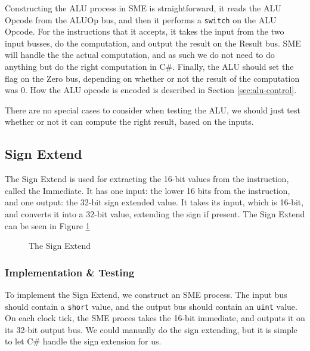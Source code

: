 Constructing the ALU process in SME is straightforward, it reads the ALU Opcode
from the ALUOp bus, and then it performs a \texttt{switch} on the ALU Opcode.
For the instructions that it accepts, it takes the input from the two input
busses, do the computation, and output the result on the Result bus. SME will
handle the the actual computation, and as such we do not need to do anything
but do the right computation in C\#. Finally, the ALU should set the flag on
the Zero bus, depending on whether or not the result of the computation was 0.
How the ALU opcode is encoded is described in Section \ref{sec:alu-control}.

There are no special cases to consider when testing the ALU, we should just
test whether or not it can compute the right result, based on the inputs.

\subsection{Sign Extend}
The Sign Extend is used for extracting the 16-bit values from the instruction,
called the Immediate. It has one input: the lower 16 bits from the
instruction, and one output: the 32-bit sign extended value. It takes its
input, which is 16-bit, and converts it into a 32-bit value, extending the sign
if present. The Sign Extend can be seen in Figure \ref{fig:sign}

\begin{figure}
    \centering
    \caption{The Sign Extend}
    \label{fig:sign}
\end{figure}

\subsubsection*{Implementation \& Testing}
To implement the Sign Extend, we construct an SME process. The input bus should
contain a \texttt{short} value, and the output bus should contain an
\texttt{uint} value. On each clock tick, the SME proces takes the 16-bit
immediate, and outputs it on its 32-bit output bus. We could manually do the
sign extending, but it is simple to let C\# handle the sign extension for us.


